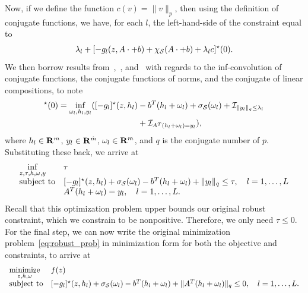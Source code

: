 Now, if we define the function $c(v) = \|v\|_p$, then using the definition of conjugate functions, we have, for each $l$, the left-hand-side of the constraint equal to
\begin{equation*}
\begin{aligned}
		\lambda_l + [-g_l(z,A\cdot+b) +\chi_{\mathcal{S}}(A\cdot+b) + \lambda_l c]^\star(0).\\
\end{aligned}
\end{equation*}
We then borrow results from~\cite[Theorem 11.23(a), p. 493]{rockafellar_wets_1998},~\cite[Lemma C.9]{zhen2021mathematical}, and~\cite[Proposition 13.24]{composites} with regards to the inf-convolution of conjugate functions, the conjugate functions of norms, and the conjugate of linear compositions, to note
\begin{align*}
	[-g_l(z,A\cdot+b)   +\chi_\supp(A\cdot+b)+ \lambda_l c]^\star (0) =  \underset{\omega_l, h_l, y_l}{\inf} ([-g_l]^\star(z,h_l) &- b^T(h_l + \omega_l) + \sigma_\supp(\omega_l)+\indicator_{\|y_l\|_q \leq \lambda_l}\\
  &+ \indicator_{A^T(h_l + \omega_l)= y_l}),
\end{align*}
where  $h_l\in{\mathbf R}^{m}$, $y_l \in {\mathbf R}^{\hat{m}}$, $\omega_l \in {\mathbf R}^{m}$, and $q$ is the conjugate number of $p$. Substituting these back, we arrive at
\begin{equation*}
\begin{aligned}
\begin{array}[t]{ll}
\underset{z,\tau, h, \omega, y}{\inf} & \tau\\
\mbox{subject to} & [-g_l]^\star(z,h_l)+ \sigma_{\mathcal{S}}(\omega_l)  -b^T(h_l + \omega_l) + \|y_l\|_q \leq \tau, \quad l = 1,\dots,L \\
 & A^T(h_l + \omega_l)= y_l,  \quad l = 1,\dots,L.
\end{array}
\end{aligned}
\end{equation*}
Recall that this optimization problem upper bounds our original robust constraint, which we constrain to be nonpositive. Therefore, we only need $\tau \leq 0$. For the final step, we can now write the original minimization problem~\eqref{eq:robust_prob} in minimization form for both the objective and constraints, to arrive at
\begin{equation*}
	\begin{aligned}
	\begin{array}[t]{ll}
	\underset{z, h, \omega}{\text{minimize}} & f(z)\\
	\mbox{subject to} & [-g_l]^\star(z,h_l)+ \sigma_{\mathcal{S}}(\omega_l)  -b^T(h_l + \omega_l) + \|A^T(h_l + \omega_l) \|_q \leq 0, \quad l = 1,\dots,L.	\end{array}
	\end{aligned}
	\end{equation*}

